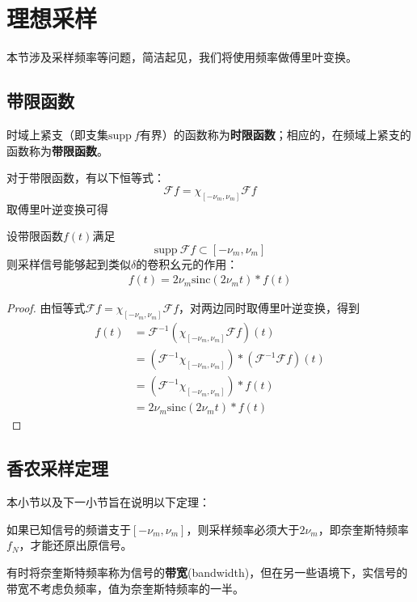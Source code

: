 \section{理想采样}\label{sec:Ideal_Sample}

本节涉及采样频率等问题，简洁起见，我们将使用频率做傅里叶变换。

\subsection{带限函数}\label{sub:band_limit}

\begin{definition}[时限函数与带限函数]
    时域上紧支（即支集$\text{supp}\ f$有界）的函数称为\textbf{时限函数}；相应的，在频域上紧支的函数称为\textbf{带限函数}。
\end{definition}

对于带限函数，有以下恒等式：
\[\mathcal{F} f=\chi_{[-\nu_m,\nu_m]}\mathcal{F} f\]
取傅里叶逆变换可得
\begin{theorem}
    设带限函数$f(t)$满足$$\text{supp}\ \mathcal{F} f\subset [-\nu_m,\nu_m]$$
    则采样信号能够起到类似$\delta$的卷积幺元的作用：\begin{align*}
        f(t)=2\nu_m\text{sinc}(2\nu_m t)*f(t)
    \end{align*}
\end{theorem}
\begin{proof}
    由恒等式$\mathcal{F} f=\chi_{[-\nu_m,\nu_m]}\mathcal{F} f$，对两边同时取傅里叶逆变换，得到
    \begin{align*}
        f(t)&=\mathcal{F} ^{-1}(\chi_{[-\nu_m,\nu_m]}\mathcal{F} f)(t)\\
               &=\left(\mathcal{F} ^{-1}\chi_{[-\nu_m,\nu_m]}\right)*\left(\mathcal{F} ^{-1}\mathcal{F} f\right)(t)\\
               &=\left(\mathcal{F} ^{-1}\chi_{[-\nu_m,\nu_m]}\right)*f(t)\\
               &=2\nu_m\text{sinc}(2\nu_m t)*f(t)
    \end{align*}
\end{proof}

\subsection{香农采样定理}\label{sub:shannon}
本小节以及下一小节旨在说明以下定理：
\begin{theorem}[香农采样定理]
    如果已知信号的频谱支于$[-\nu_m,\nu_m]$，则采样频率必须大于$2\nu_m$，即奈奎斯特频率$f_N$，才能还原出原信号\cite{brad_osgood_ee261}。
\end{theorem}
有时将奈奎斯特频率称为信号的\textbf{带宽}(bandwidth)，但在另一些语境下，实信号的带宽不考虑负频率，值为奈奎斯特频率的一半。


